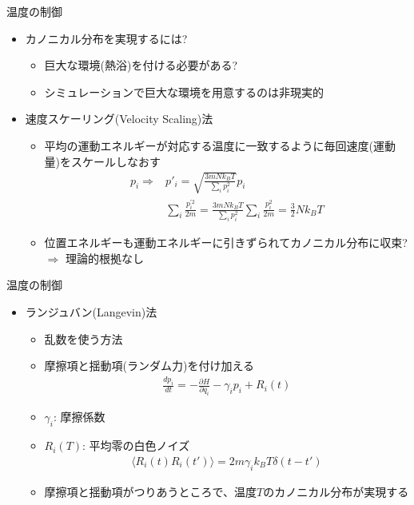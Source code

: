 \documentclass[dvipdfmx]{beamer}
\begin{document}

%

%


\begin{frame}[t,fragile]{温度の制御}
  \begin{itemize}
  \item カノニカル分布を実現するには?
    \begin{itemize}
    \item 巨大な環境(熱浴)を付ける必要がある?
    \item シミュレーションで巨大な環境を用意するのは非現実的
    \end{itemize}
  \item 速度スケーリング(Velocity Scaling)法
    \begin{itemize}
    \item 平均の運動エネルギーが対応する温度に一致するように毎回速度(運動量)をスケールしなおす
      \begin{align*}
        p_i \Rightarrow &p'_i = \sqrt{ \frac{3mNk_BT}{\sum_i p_i^2} } p_i \\
        & \sum_i \frac{p_i^{'2}}{2m} = \frac{3mNk_BT}{\sum_i p_i^2} \sum_i \frac{p_i^2}{2m} = \frac{3}{2} N k_B T
      \end{align*}
    \item 位置エネルギーも運動エネルギーに引きずられてカノニカル分布に収束? $\Rightarrow$ 理論的根拠なし
    \end{itemize}
  \end{itemize}
\end{frame}

\begin{frame}[t,fragile]{温度の制御}
  \begin{itemize}
  \item ランジュバン(Langevin)法
    \begin{itemize}
    \item 乱数を使う方法
    \item 摩擦項と揺動項(ランダム力)を付け加える
      \begin{align*}
        \frac{dp_i}{dt} = - \frac{\partial H}{\partial q_i} - \gamma_i p_i + R_i(t)
      \end{align*}
    \item $\gamma_i$: 摩擦係数
    \item $R_i(T)$: 平均零の白色ノイズ
      \begin{align*}
        \langle R_i(t) R_i(t') \rangle = 2 m \gamma_i k_B T \delta(t-t')
      \end{align*}
    \item 摩擦項と揺動項がつりあうところで、温度$T$のカノニカル分布が実現する
    \end{itemize}
  \end{itemize}
\end{frame}
\end{document}
